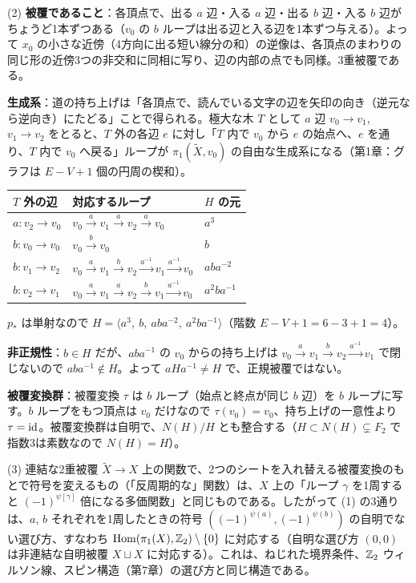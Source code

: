 \begin{solution}
(2) \textbf{被覆であること}：各頂点で、出る $a$ 辺・入る $a$ 辺・出る $b$ 辺・入る $b$ 辺がちょうど1本ずつある（$v_0$ の $b$ ループは出る辺と入る辺を1本ずつ与える）。よって $x_0$ の小さな近傍（4方向に出る短い線分の和）の逆像は、各頂点のまわりの同じ形の近傍3つの非交和に同相に写り、辺の内部の点でも同様。3重被覆である。

\textbf{生成系}：道の持ち上げは「各頂点で、読んでいる文字の辺を矢印の向き（逆元なら逆向き）にたどる」ことで得られる。極大な木 $T$ として $a$ 辺 $v_0\to v_1$, $v_1\to v_2$ をとると、$T$ 外の各辺 $e$ に対し「$T$ 内で $v_0$ から $e$ の始点へ、$e$ を通り、$T$ 内で $v_0$ へ戻る」ループが $\pi_1(\tilde X,v_0)$ の自由な生成系になる（第1章：グラフは $E-V+1$ 個の円周の楔和）。
\begin{center}
\begin{tabular}{lll}
$T$ 外の辺 & 対応するループ & $H$ の元\\ \hline
$a\colon v_2\to v_0$ & $v_0\xrightarrow{a}v_1\xrightarrow{a}v_2\xrightarrow{a}v_0$ & $a^3$\\
$b\colon v_0\to v_0$ & $v_0\xrightarrow{b}v_0$ & $b$\\
$b\colon v_1\to v_2$ & $v_0\xrightarrow{a}v_1\xrightarrow{b}v_2\xrightarrow{a^{-1}}v_1\xrightarrow{a^{-1}}v_0$ & $aba^{-2}$\\
$b\colon v_2\to v_1$ & $v_0\xrightarrow{a}v_1\xrightarrow{a}v_2\xrightarrow{b}v_1\xrightarrow{a^{-1}}v_0$ & $a^2ba^{-1}$
\end{tabular}
\end{center}
$p_*$ は単射なので $H=\langle a^3,\ b,\ aba^{-2},\ a^2ba^{-1}\rangle$（階数 $E-V+1=6-3+1=4$）。

\textbf{非正規性}：$b\in H$ だが、$aba^{-1}$ の $v_0$ からの持ち上げは $v_0\xrightarrow{a}v_1\xrightarrow{b}v_2\xrightarrow{a^{-1}}v_1$ で閉じないので $aba^{-1}\notin H$。よって $aHa^{-1}\ne H$ で、正規被覆ではない。

\textbf{被覆変換群}：被覆変換 $\tau$ は $b$ ループ（始点と終点が同じ $b$ 辺）を $b$ ループに写す。$b$ ループをもつ頂点は $v_0$ だけなので $\tau(v_0)=v_0$、持ち上げの一意性より $\tau=\mathrm{id}$。被覆変換群は自明で、$N(H)/H$ とも整合する（$H\subset N(H)\subsetneq F_2$ で指数3は素数なので $N(H)=H$）。

(3) 連結な2重被覆 $\tilde X\to X$ 上の関数で、2つのシートを入れ替える被覆変換のもとで符号を変えるもの（「反周期的な」関数）は、$X$ 上の「ループ $\gamma$ を1周すると $(-1)^{\psi[\gamma]}$ 倍になる多価関数」と同じものである。したがって (1) の3通りは、$a$, $b$ それぞれを1周したときの符号 $((-1)^{\psi(a)},(-1)^{\psi(b)})$ の自明でない選び方、すなわち $\mathrm{Hom}(\pi_1(X),\mathbb{Z}_2)\setminus\{0\}$ に対応する（自明な選び方 $(0,0)$ は非連結な自明被覆 $X\sqcup X$ に対応する）。これは、ねじれた境界条件、$\mathbb{Z}_2$ ウィルソン線、スピン構造（第7章）の選び方と同じ構造である。
\end{solution}

